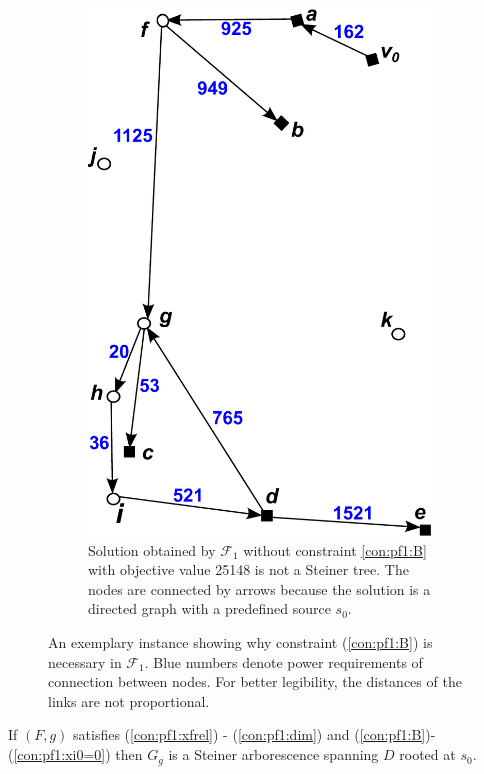 \begin{figure}[!htb]
\begin{subfigure}[b]{0.4\textwidth}
        \includegraphics[width=\textwidth]{conBNec2}
        \caption{Solution obtained by $\mathcal{F}_1$ without constraint \ref{con:pf1:B} with objective value 25148 is not a Steiner tree.
		 The nodes are connected by arrows because the solution is a directed graph with a predefined source $s_0$.}
        \label{fig:Bpf2}
    \end{subfigure}
    \caption{An exemplary instance showing why constraint (\ref{con:pf1:B}) is necessary in $\mathcal{F}_1$.
		Blue numbers denote power requirements of connection between nodes.
		For better legibility, the distances of the links are not proportional.} 
    \label{fig:BProof}
\end{figure}

\begin{prop}
\label{prop:modelcorrect}
If $(F,g)$ satisfies (\ref{con:pf1:xfrel}) - (\ref{con:pf1:dim}) and (\ref{con:pf1:B})-(\ref{con:pf1:xi0=0}) then $G_{g}$ is a Steiner arborescence spanning $D$ rooted at $s_0$.
\end{prop}
 
